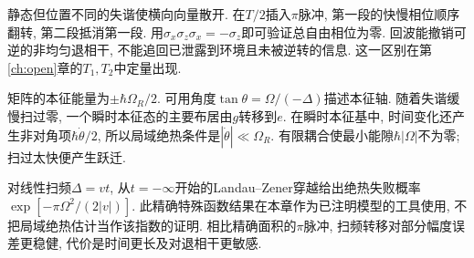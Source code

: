 静态但位置不同的失谐使横向向量散开. 在$T/2$插入$\pi$脉冲, 第一段的快慢相位顺序翻转, 第二段抵消第一段. 用$\sigma_x\sigma_z\sigma_x=-\sigma_z$即可验证总自由相位为零. 回波能撤销可逆的非均匀退相干, 不能追回已泄露到环境且未被逆转的信息. 这一区别在第\ref{ch:open}章的$T_1,T_2$中定量出现.

矩阵的本征能量为$\pm\hbar\Omega_R/2$. 可用角度$\tan\theta=\Omega/(-\Delta)$描述本征轴. 随着失谐缓慢扫过零, 一个瞬时本征态的主要布居由$g$转移到$e$. 在瞬时本征基中, 时间变化还产生非对角项$\hbar\dot\theta/2$, 所以局域绝热条件是$|\dot\theta|\ll\Omega_R$. 有限耦合使最小能隙$\hbar|\Omega|$不为零; 扫过太快便产生跃迁.

对线性扫频$\Delta=vt$, 从$t=-\infty$开始的Landau--Zener穿越给出绝热失败概率$\exp[-\pi\Omega^2/(2|v|)]$. 此精确特殊函数结果在本章作为已注明模型的工具使用, 不把局域绝热估计当作该指数的证明. 相比精确面积的$\pi$脉冲, 扫频转移对部分幅度误差更稳健, 代价是时间更长及对退相干更敏感.
